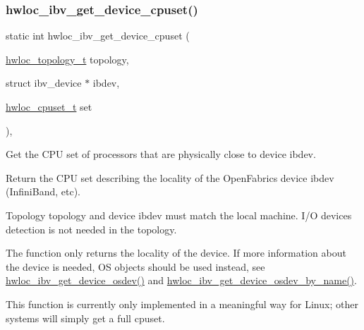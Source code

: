 \subsubsection{\texorpdfstring{hwloc\+\_\+ibv\+\_\+get\+\_\+device\+\_\+cpuset()}{hwloc\_ibv\_get\_device\_cpuset()}}
{\footnotesize\ttfamily static int hwloc\+\_\+ibv\+\_\+get\+\_\+device\+\_\+cpuset (\begin{DoxyParamCaption}\item[{\hyperlink{a00186_ga9d1e76ee15a7dee158b786c30b6a6e38}{hwloc\+\_\+topology\+\_\+t}}]{topology,  }\item[{struct ibv\+\_\+device $\ast$}]{ibdev,  }\item[{\hyperlink{a00183_ga4bbf39b68b6f568fb92739e7c0ea7801}{hwloc\+\_\+cpuset\+\_\+t}}]{set }\end{DoxyParamCaption})\hspace{0.3cm}{\ttfamily [inline]}, {\ttfamily [static]}}



Get the C\+PU set of processors that are physically close to device {\ttfamily ibdev}. 

Return the C\+PU set describing the locality of the Open\+Fabrics device {\ttfamily ibdev} (Infini\+Band, etc).

Topology {\ttfamily topology} and device {\ttfamily ibdev} must match the local machine. I/O devices detection is not needed in the topology.

The function only returns the locality of the device. If more information about the device is needed, OS objects should be used instead, see \hyperlink{a00224_ga7324cdfd5db6ed2669c051ef7e1b64e1}{hwloc\+\_\+ibv\+\_\+get\+\_\+device\+\_\+osdev()} and \hyperlink{a00224_ga31d794567f4420bbdc8baa7bf8bf6138}{hwloc\+\_\+ibv\+\_\+get\+\_\+device\+\_\+osdev\+\_\+by\+\_\+name()}.

This function is currently only implemented in a meaningful way for Linux; other systems will simply get a full cpuset. \mbox{\label{a00224_ga7324cdfd5db6ed2669c051ef7e1b64e1}} 
